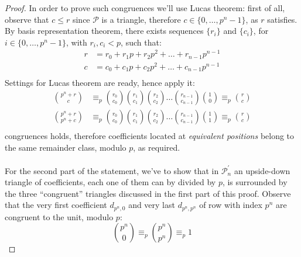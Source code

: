 \documentclass[10pt,a4paper]{article} %
\begin{document}
\begin{proof}
      In order to prove such congruences we'll use Lucas theorem:
      first of all, observe that $c \leq r$ since $\mathcal{P}$ is a
      triangle, therefore $c \in \lbrace 0, \ldots, p^n -1 \rbrace$,
      as $r$ satisfies.  By basis representation theorem, there exists
      sequences $\lbrace r_i\rbrace$ and $\lbrace c_i\rbrace$, for
      $i \in \lbrace 0, \ldots, p^n -1 \rbrace$, with $r_i,c_i < p$,
      such that:
      \begin{displaymath}
        \begin{split}
          r &= r_0 + r_1 p + r_2 p^2 + \ldots + r_{n-1}p^{n-1} \\
          c &= c_0 + c_1 p + c_2 p^2 + \ldots + c_{n-1}p^{n-1} \\
        \end{split}
      \end{displaymath}
      Settings for Lucas theorem are ready, hence apply it:
      \begin{displaymath}
        \begin{split}
          {{p^n+r} \choose {c}} &\equiv_{p} {{r_0} \choose {c_0}} {{r_1} \choose {c_1}}{{r_2} \choose {c_2}} \ldots 
          {{r_{n-1}} \choose {c_{n-1}}}{{1} \choose {0}} \equiv_{p} {{r} \choose {c}}\\
          {{p^n+r} \choose {p^n+c}} &\equiv_{p} {{r_0} \choose {c_0}} {{r_1} \choose {c_1}}{{r_2} \choose {c_2}} \ldots 
          {{r_{n-1}} \choose {c_{n-1}}}{{1} \choose {1}} \equiv_{p} {{r} \choose {c}}\\
        \end{split}
      \end{displaymath}
      congruences holds, therefore coefficients located at
      \emph{equivalent positions} belong to the same remainder class,
      modulo $p$, as required.
      \\\\
      For the second part of the statement, we've to show that in
      $\mathcal{P}_{n}^\prime$ an upside-down triangle of
      coefficients, each one of them can by divided by $p$, is
      surrounded by the three ``congruent'' triangles discussed in the
      first part of this proof.  Observe that the very first
      coefficient $d_{p^n, 0}$ and very last $d_{p^n, p^n}$ of row
      with index $p^n$ are congruent to the unit, modulo $p$:
      \begin{displaymath}
        {{p^n} \choose {0}} \equiv_{p}{{p^n} \choose {p^n}} \equiv_{p} 1
      \end{displaymath}

\end{proof}
\end{document}
